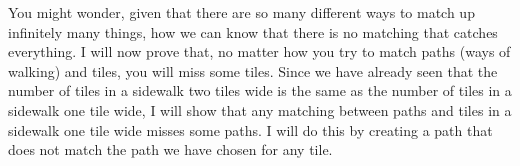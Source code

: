 \documentclass[letterpaper,11pt,showproblems]{pset}
\theoremstyle{definition} \newtheorem{defn}{Definition}[section]
\theoremstyle{definition} \newtheorem*{defn*}{Definition}
\begin{document}
  You might wonder, given that there are so many different ways to match up infinitely many things, how we can know that there is no matching that catches everything.  I will now prove that, no matter how you try to match paths (ways of walking) and tiles, you will miss some tiles.  Since we have already seen that the number of tiles in a sidewalk two tiles wide is the same as the number of tiles in a sidewalk one tile wide, I will show that any matching between paths and tiles in a sidewalk one tile wide misses some paths.  I will do this by creating a path that does not match the path we have chosen for any tile.

  \makeatletter
  \newcommand{\tile}[1]{
    \begingroup
      \newcount\@n
      \@n=1\relax
      \loop
        \framebox[2\height][c]{\the\@n}\hspace{-\fboxrule}%
      \ifnum\@n<#1\relax\advance\@n by 1\repeat
      \let\@vrule=\vrule
      \renewcommand{\vrule}[6]{\phantom{\@vrule##1##2##3##4##5##6}}%
      \framebox[2\height][c]{{\let\vrule\@vrule\ \vphantom{1}\small$\cdots$}}%
    \endgroup
  }
  \makeatother
  
\end{document}
